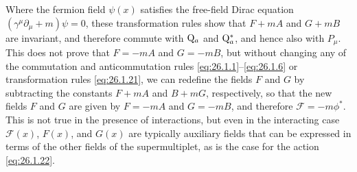 Where the fermion field \(\psi(x)\) satisfies the free-field Dirac equation
\((\gamma^\mu\partial_\mu+m)\psi=0\), these transformation rules show that
\(F+mA\) and \(G+mB\) are invariant, and therefore commute with
\(\mathrm{Q}_a\) and \(\mathrm{Q}_a^*\), and hence also with \(P_\mu\). This does not
prove that \(F=-mA\) and \(G=-mB\), but without changing any of the
commutation and anticommutation rules
\eqref{eq:26.1.1}--\eqref{eq:26.1.6} or transformation rules
\eqref{eq:26.1.21}, we can redefine the fields \(F\) and \(G\) by subtracting
the constants \(F+mA\) and \(B+mG\), respectively, so that the new fields
\(F\) and \(G\) are given by \(F=-mA\) and \(G=-mB\), and therefore
\(\mathcal{F}=-m\phi^*\). This is not true in the presence of interactions,
but even in the interacting case \(\mathcal{F}(x)\), \(F(x)\), and \(G(x)\)
are typically auxiliary fields that can be expressed in terms of the other
fields of the supermultiplet, as is the case for the action
\eqref{eq:26.1.22}.
